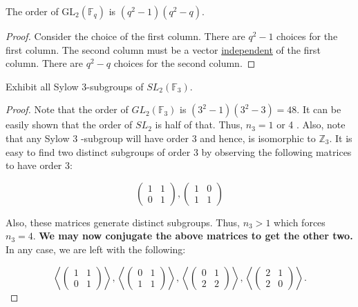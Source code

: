 \begin{lemma}
    The order of $\mathrm{GL}_2(\mathbb{F}_q)$ is $(q^2-1)(q^2-q)$.
\end{lemma}

\begin{proof}
    Consider the choice of the first column. There are $q^2-1$ choices for the first column. The second column must be a vector \underline{independent} of the first column. There are $q^2-q$ choices for the second column.
\end{proof}

\begin{exercise}
Exhibit all Sylow 3-subgroups of $S L_2\left(\mathbb{F}_3\right)$.
\end{exercise}

\begin{proof}
Note that the order of $G L_2\left(\mathbb{F}_3\right)$ is $\left(3^2-1\right)\left(3^2-3\right)=48$. It can be easily shown that the order of $S L_2$ is half of that.
Thus, $n_3=1$ or 4 . Also, note that any Sylow 3 -subgroup will have order 3 and hence, is isomorphic to $\mathbb{Z}_3$.
It is easy to find two distinct subgroups of order 3 by observing the following matrices to have order 3:

$$
\left(\begin{array}{ll}
1 & 1 \\
0 & 1
\end{array}\right),\left(\begin{array}{ll}
1 & 0 \\
1 & 1
\end{array}\right)
$$


Also, these matrices generate distinct subgroups. Thus, $n_3>1$ which forces $n_3=4$. \textbf{We may now conjugate the above matrices to get the other two.} In any case, we are left with the following:

$$
\left\langle\left(\begin{array}{ll}
1 & 1 \\
0 & 1
\end{array}\right)\right\rangle,\left\langle\left(\begin{array}{ll}
0 & 1 \\
1 & 1
\end{array}\right)\right\rangle,\left\langle\left(\begin{array}{ll}
0 & 1 \\
2 & 2
\end{array}\right)\right\rangle,\left\langle\left(\begin{array}{ll}
2 & 1 \\
2 & 0
\end{array}\right)\right\rangle .
$$
\end{proof}


